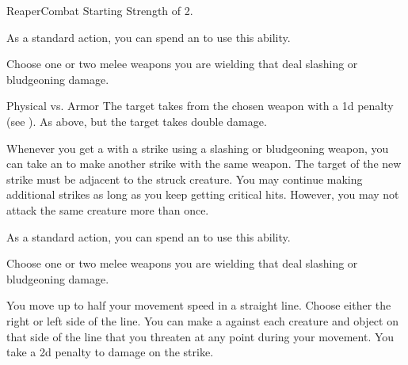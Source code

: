     \begin{feat}{Reaper}{Combat}
        \featpre Starting Strength of 2.

         As a standard action, you can spend an  to use this ability.
        \begin{ability}
            \begin{spelltargetinginfo}
                \spellspecial Choose one or two melee weapons you are wielding that deal slashing or bludgeoning damage.
            \end{spelltargetinginfo}
            \begin{spelleffects}
                \begin{spellattack}{Physical vs. Armor}
                    \spellsuccess The target takes  from the chosen weapon with a \minus1d penalty (see ).
                    \spellcritical As above, but the target takes double damage.
                \end{spellattack}
            \end{spelleffects}
        \end{ability}

         Whenever you get a  with a strike using a slashing or bludgeoning weapon, you can take an  to make another strike with the same weapon.
        The target of the new strike must be adjacent to the struck creature.
        You may continue making additional strikes as long as you keep getting critical hits.
        However, you may not attack the same creature more than once.

         As a standard action, you can spend an  to use this ability.
        \begin{ability}
            \begin{spelltargetinginfo}
                \spellspecial Choose one or two melee weapons you are wielding that deal slashing or bludgeoning damage.
            \end{spelltargetinginfo}
            \begin{spelleffects}
                \spelleffect You move up to half your movement speed in a straight line.
                Choose either the right or left side of the line.
                You can make a  against each creature and object on that side of the line that you threaten at any point during your movement.
                You take a \minus2d penalty to damage on the strike.
            \end{spelleffects}
        \end{ability}


\end{feat}
